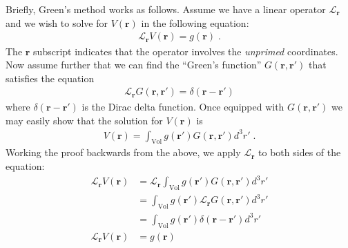 \documentclass[12pt]{article}
\renewcommand{\vec}[1]{\boldsymbol{#1}}
\begin{document}
Briefly, Green's method works as follows.  Assume we have a linear operator $\mathcal{L}_{\vec{r}}$ and we 
wish to solve for $V(\vec{r})$ in the following equation:
\begin{align}
 \mathcal{L}_{\vec{r}} V(\vec{r}) = g(\vec{r}) \;.
\end{align}
The $\vec r$ subscript indicates that the operator involves the \emph{unprimed} 
coordinates.
Now assume further that we can find the ``Green's function''
$G(\vec{r}, \vec{r}')$ that satisfies the equation
\begin{align}
\mathcal{L}_{\vec{r}} G(\vec{r}, \vec{r}') = \delta(\vec{r}-\vec{r}')
\end{align}
where $\delta(\vec{r}-\vec{r}')$ is the Dirac delta function.  Once equipped with $G(\vec{r}, \vec{r}')$ we may easily
show that the solution for $V(\vec{r})$ is
\begin{align}\label{eqn:useg}
V(\vec{r}) = \int_{\text{Vol}} g(\vec{r}')G(\vec{r}, \vec{r}') d^3 r'\;.
\end{align}
Working the proof backwards from the above, we apply $\mathcal{L}_{\vec{r}}$ to both sides of the equation:
\begin{align}
\mathcal{L}_{\vec{r}} V(\vec{r}) &= \mathcal{L}_{\vec{r}} \int_{\text{Vol}} g(\vec{r}')G(\vec{r}, \vec{r}')d^3 r' \\
&= \int_{\text{Vol}} g(\vec{r}')  \mathcal{L}_{\vec{r}} G(\vec{r}, \vec{r}') d^3 r' \\
    &= \int_{\text{Vol}} g(\vec{r}')  \delta(\vec{r} - \vec{r}') d^3 r' \\
    \mathcal{L}_{\vec{r}} V(\vec{r}) &= g(\vec{r})
\end{align}
\end{document}
